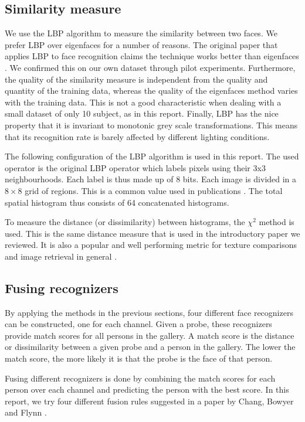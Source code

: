\documentclass[]{article}
\begin{document}
\subsection{Similarity measure}
We use the LBP algorithm to measure the similarity between two faces. We prefer LBP over eigenfaces for a number of reasons. The original paper that applies LBP to face recognition claims the technique works better than eigenfaces \cite{ahonen2004face}. We confirmed this on our own dataset through pilot experiments. Furthermore, the quality of the similarity measure is independent from the quality and quantity of the training data, whereas the quality of the eigenfaces method varies with the training data. This is not a good characteristic when dealing with a small dataset of only 10 subject, as in this report. Finally, LBP has the nice property that it is invariant to monotonic grey scale transformations. This means that its recognition rate is barely affected by different lighting conditions.

The following configuration of the LBP algorithm is used in this report. The used operator is the original LBP operator which labels pixels using their 3x3 neighbourhoods. Each label is thus made up of 8 bits. Each image is divided in a $8 \times 8$ grid of regions. This is a common value used in publications \cite{facerecognizer2016}. The total spatial histogram thus consists of 64 concatenated histograms.

To measure the distance (or dissimilarity) between histograms, the $\chi^2$ method is used. This is the same distance measure that is used in the introductory paper we reviewed. It is also a popular and well performing metric for texture comparisons and image retrieval in general \cite{puzicha1997non}.

\subsection{Fusing recognizers}
By applying the methods in the previous sections, four different face recognizers can be constructed, one for each channel. Given a probe, these recognizers provide match scores for all persons in the gallery. A match score is the distance or dissimilarity between a given probe and a person in the gallery. The lower the match score, the more likely it is that the probe is the face of that person.

Fusing different recognizers is done by combining the match scores for each person over each channel and predicting the person with the best score. In this report, we try four different fusion rules suggested in a paper by Chang, Bowyer and Flynn \cite{chang2005evaluation}.
\end{document}
